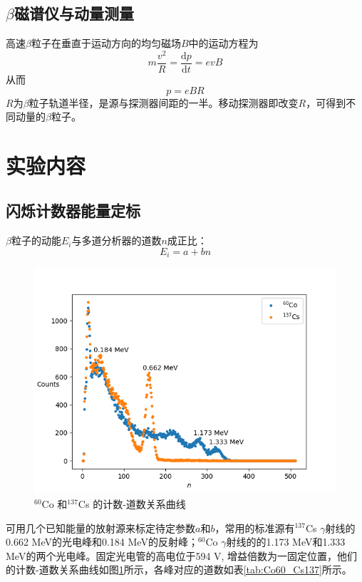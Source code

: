 \documentclass[aps,pre,12pt,preprint,onecolumn,showpacs,showkeys]{revtex4-1}
\def \d {\mathrm d}
\begin{document}
    \subsection{$\beta$磁谱仪与动量测量}
    高速$\beta$粒子在垂直于运动方向的均匀磁场$B$中的运动方程为
    \begin{equation}
        m\frac{v^2}{R}=\frac{\d p}{\d t}=evB
    \end{equation}
    从而
    \begin{equation}
        p=eBR
    \end{equation}
    $R$为$\beta$粒子轨道半径，是源与探测器间距的一半。移动探测器即改变$R$，可得到不同动量的$\beta$粒子。

\section{实验内容}
    \subsection{闪烁计数器能量定标}
    $\beta$粒子的动能$E_i$与多道分析器的道数$n$成正比：
    \begin{equation}
        E_i=a+bn
    \end{equation}
    \begin{figure}[ht]
        \centering
        \includegraphics[width=120mm]{Co60_Cs137}
        \caption{\label{fig:Co60_Cs137}%
        $^{60}$Co 和$^{137}$Cs 的计数-道数关系曲线}
    \end{figure}
    可用几个已知能量的放射源来标定待定参数$a$和$b$，常用的标准源有$^{137}$Cs $\gamma$射线的0.662 MeV的光电峰和0.184 MeV的反射峰；$^{60}$Co $\gamma$射线的的1.173 MeV和1.333 MeV的两个光电峰。固定光电管的高电位于594 V, 增益倍数为一固定位置，他们的计数-道数关系曲线如图\ref{fig:Co60_Cs137}所示，各峰对应的道数如表\ref{tab:Co60_Cs137}所示。
\end{document}
